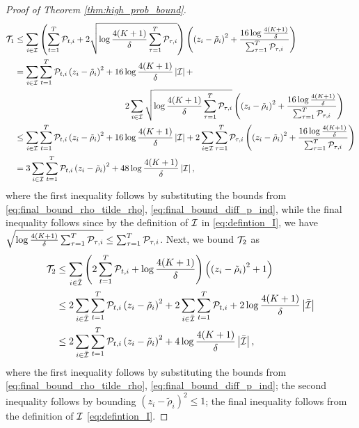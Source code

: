 \begin{proof}[Proof of Theorem \ref{thm:high_prob_bound}]
\begin{align*}
    \cT_{1} &\le \sum_{i \in \cI} \bigc{\sum_{t = 1} ^ {T} \cP_{t, i} + 2 \sqrt{\log \frac{4 (K + 1)}{\delta}\sum_{\tau = 1} ^ {T} \cP_{\tau, i}}} \bigc{\bigc{z_{i} - \tilde{\rho}_i} ^ 2 + \frac{16 \log \frac{4(K + 1)}{\delta}}{\sum_{\tau = 1} ^ {T} \cP_{\tau, i}}} \\
    &= \sum_{i \in \cI} \sum_{t = 1} ^ {T} \cP_{t, i} \bigc{z_{i} - \tilde{\rho}_{i}} ^ 2 + 16 \log \frac{4(K+1)}{\delta}\abs{\cI} + \\
    &\hspace{45mm} 2 \sum_{i \in \cI} \sqrt{\log \frac{4 (K + 1)}{\delta}\sum_{\tau = 1} ^ {T} \cP_{\tau, i}} \bigc{\bigc{z_{i} - \tilde{\rho}_i} ^ 2 +  \frac{16 \log \frac{4(K+1)}{\delta}}{\sum_{\tau = 1} ^ {T} \cP_{\tau, i}}} \\
    & \le \sum_{i \in \cI} \sum_{t = 1} ^ {T} \cP_{t, i} \bigc{z_{i} - \tilde{\rho}_{i}} ^ 2 + 16 \log \frac{4(K+1)}{\delta}\abs{\cI} + 2 \sum_{i \in \cI} \sum_{\tau = 1} ^ {T} \cP_{\tau, i} \bigc{\bigc{z_{i} - \tilde{\rho}_i} ^ 2 +  \frac{16 \log \frac{4(K+1)}{\delta}}{\sum_{\tau = 1} ^ {T} \cP_{\tau, i}}} \\
    &=  3\sum_{i \in \cI} \sum_{t = 1} ^ {T} \cP_{t, i} \bigc{z_{i} - \tilde{\rho}_{i}} ^ 2 + 48 \log \frac{4(K+1)}{\delta}\abs{\cI},
\end{align*}
where the first inequality follows by substituting the bounds from \eqref{eq:final_bound_rho_tilde_rho}, \eqref{eq:final_bound_diff_p_ind}, while the final inequality follows since by the definition of $\mathcal{I}$ in \eqref{eq:defintion_I}, we have $\sqrt{\log \frac{4(K + 1)}{\delta} \sum_{\tau = 1} ^ {T} \mathcal{P}_{\tau, i}} \le \sum_{\tau = 1} ^ {T} \mathcal{P}_{\tau, i}$. Next, we bound $\mathcal{T}_{2}$ as \begin{align*}
    \mathcal{T}_{2} &\le \sum_{i \in \bar{\mathcal{I}}} \left( 2\sum_{t = 1} ^ {T} \mathcal{P}_{t, i} + \log \frac{4 (K + 1)}{\delta} \right) \left( \left( z_{i} - \tilde{\rho}_i \right) ^ 2 + 1 \right) \\
    &\le 2 \sum_{i \in \bar{\mathcal{I}}} \sum_{t = 1} ^ {T} \mathcal{P}_{t, i} \left( z_{i} - \tilde{\rho}_i \right)^2 + 2 \sum_{i \in \bar{\mathcal{I}}} \sum_{t = 1} ^ {T} \mathcal{P}_{t, i} + 2 \log \frac{4 (K + 1)}{\delta} \left\lvert\bar{\mathcal{I}}\right\rvert \\
    & \le 2 \sum_{i \in \bar{\mathcal{I}}} \sum_{t = 1} ^ {T} \mathcal{P}_{t, i} \left( z_{i} - \tilde{\rho}_i \right)^2 + 4 \log \frac{4 (K + 1)}{\delta} \left\lvert\bar{\mathcal{I}}\right\rvert,
\end{align*}
where the first inequality follows by substituting the bounds from \eqref{eq:final_bound_rho_tilde_rho}, \eqref{eq:final_bound_diff_p_ind}; the second inequality follows by bounding $(z_{i} - \tilde{\rho}_i)^2 \le 1$; the final inequality follows from the definition of $\mathcal{I}$ \eqref{eq:defintion_I}.

\end{proof}
